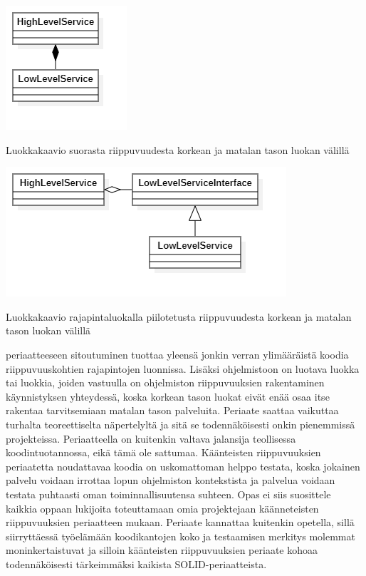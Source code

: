 \documentclass{tufte-book}
\begin{document}
\begin{listing}
    \includegraphics{NoDIPExample}
    \caption{Luokkakaavio suorasta riippuvuudesta korkean ja matalan tason luokan välillä}
    \label{luokkakaavioluokka}
\end{listing}

\begin{listing}
    \includegraphics{DIPExample}
    \caption{Luokkakaavio rajapintaluokalla piilotetusta riippuvuudesta korkean ja matalan tason luokan välillä}
    \label{luokkakaavioluokka}
\end{listing}

 periaatteeseen sitoutuminen tuottaa yleensä jonkin verran
ylimääräistä koodia riippuvuuskohtien rajapintojen luonnissa. Lisäksi ohjelmistoon on luotava
luokka tai luokkia, joiden vastuulla on ohjelmiston riippuvuuksien rakentaminen käynnistyksen
yhteydessä, koska korkean tason luokat eivät enää osaa itse rakentaa tarvitsemiaan matalan tason
palveluita. Periaate saattaa vaikuttaa turhalta teoreettiselta näpertelyltä ja sitä se
todennäköisesti onkin pienemmissä projekteissa. Periaatteella on kuitenkin valtava jalansija
teollisessa koodintuotannossa, eikä tämä ole sattumaa. Käänteisten riippuvuuksien periaatetta
noudattavaa koodia on uskomattoman helppo testata, koska jokainen palvelu voidaan irrottaa lopun
ohjelmiston kontekstista ja palvelua voidaan testata puhtaasti oman toiminnallisuutensa suhteen.
Opas ei siis suosittele kaikkia oppaan lukijoita toteuttamaan omia projektejaan käänneteisten
riippuvuuksien periaatteen mukaan. Periaate kannattaa kuitenkin opetella, sillä siirryttäessä
työelämään koodikantojen koko ja testaamisen merkitys molemmat moninkertaistuvat ja silloin
käänteisten riippuvuuksien periaate kohoaa todennäköisesti tärkeimmäksi kaikista 
SOLID-periaatteista.
\end{document}
